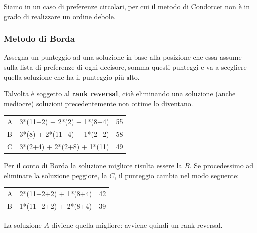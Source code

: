 \documentclass[\main/main.tex]{subfiles}
\begin{document}
Siamo in un caso di preferenze circolari, per cui il metodo di Condorcet non è in grado di realizzare un ordine debole.

\subsubsection*{Metodo di Borda}
Assegna un punteggio ad una soluzione in base alla posizione che essa assume sulla lista di preferenze di ogni decisore, somma questi punteggi e va a scegliere quella soluzione che ha il punteggio più alto.

Talvolta è soggetto al \textbf{rank reversal}, cioè eliminando una soluzione (anche mediocre) soluzioni precedentemente non ottime lo diventano.

\begin{table}
  \begin{tabular}{|L|L|L|}
    \hline
     &                &  \\
    \hline
    A             & 3*(11+2) + 2*(2) + 1*(8+4) & 55               \\
    \hline
    B             & 3*(8) + 2*(11+4) + 1*(2+2) & 58               \\
    \hline
    C             & 3*(2+4) + 2*(2+8) + 1*(11) & 49               \\
    \hline
  \end{tabular}
\end{table}

Per il conto di Borda la soluzione migliore risulta essere la $B$. Se procedessimo ad eliminare la soluzione peggiore, la $C$, il punteggio cambia nel modo seguente:

\begin{table}
  \begin{tabular}{|L|L|L|}
    \hline
     &          &  \\
    \hline
    A             & 2*(11+2+2) + 1*(8+4) & 42               \\
    \hline
    B             & 1*(11+2+2) + 2*(8+4) & 39               \\
    \hline
  \end{tabular}
\end{table}

La soluzione $A$ diviene quella migliore: avviene quindi un rank reversal.
\end{document}
